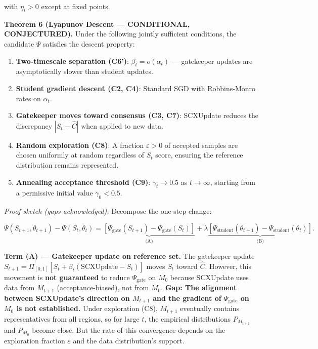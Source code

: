 \documentclass[
  12pt,
]{article}
\providecommand{\tightlist}{%
  \setlength{\itemsep}{0pt}\setlength{\parskip}{0pt}}
\begin{document}
with \(\eta_t > 0\) except at fixed points.

\textbf{Theorem 6 (Lyapunov Descent --- CONDITIONAL, CONJECTURED).}
Under the following jointly sufficient conditions, the candidate
\(\Psi\) satisfies the descent property:

\begin{enumerate}
\def\labelenumi{\arabic{enumi}.}
\tightlist
\item
  \textbf{Two-timescale separation (C6')}: \(\beta_t = o(\alpha_t)\) ---
  gatekeeper updates are asymptotically slower than student updates.
\item
  \textbf{Student gradient descent (C2, C4)}: Standard SGD with
  Robbins-Monro rates on \(\alpha_t\).
\item
  \textbf{Gatekeeper moves toward consensus (C3, C7)}: SCXUpdate reduces
  the discrepancy \(|S_t - \hat{C}|\) when applied to new data.
\item
  \textbf{Random exploration (C8)}: A fraction \(\varepsilon > 0\) of
  accepted samples are chosen uniformly at random regardless of \(S_t\)
  score, ensuring the reference distribution remains represented.
\item
  \textbf{Annealing acceptance threshold (C9)}: \(\gamma_t \to 0.5\) as
  \(t \to \infty\), starting from a permissive initial value
  \(\gamma_0 < 0.5\).
\end{enumerate}

\emph{Proof sketch (gaps acknowledged).} Decompose the one-step change:

\[\Psi(S_{t+1}, \theta_{t+1}) - \Psi(S_t, \theta_t) = \underbrace{[\Psi_{\text{gate}}(S_{t+1}) - \Psi_{\text{gate}}(S_t)]}_{\text{(A)}} + \lambda \underbrace{[\Psi_{\text{student}}(\theta_{t+1}) - \Psi_{\text{student}}(\theta_t)]}_{\text{(B)}}.\]

\textbf{Term (A) --- Gatekeeper update on reference set.} The gatekeeper
update \(S_{t+1} = \Pi_{[0,1]}[S_t + \beta_t(\text{SCXUpdate} - S_t)]\)
moves \(S_t\) toward \(\hat{C}\). However, this movement is \textbf{not
guaranteed} to reduce \(\Psi_{\text{gate}}\) on \(M_0\) because
SCXUpdate uses data from \(M_{t+1}\) (acceptance-biased), not from
\(M_0\). \textbf{Gap: The alignment between SCXUpdate's direction on
\(M_{t+1}\) and the gradient of \(\Psi_{\text{gate}}\) on \(M_0\) is not
established.} Under exploration (C8), \(M_{t+1}\) eventually contains
representatives from all regions, so for large \(t\), the empirical
distributions \(P_{M_{t+1}}\) and \(P_{M_0}\) become close. But the rate
of this convergence depends on the exploration fraction \(\varepsilon\)
and the data distribution's support.
\end{document}
